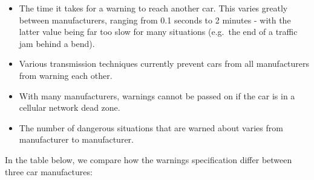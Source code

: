 \documentclass[
]{book}
\providecommand{\tightlist}{%
  \setlength{\itemsep}{0pt}\setlength{\parskip}{0pt}}
\begin{document}
\begin{itemize}
\tightlist
\item
  The time it takes for a warning to reach another car. This varies greatly between manufacturers, ranging from 0.1 seconds to 2 minutes - with the latter value being far too slow for many situations (e.g.~the end of a traffic jam behind a bend).
\item
  Various transmission techniques currently prevent cars from all manufacturers from warning each other.
\item
  With many manufacturers, warnings cannot be passed on if the car is in a cellular network dead zone.
\item
  The number of dangerous situations that are warned about varies from manufacturer to manufacturer.
\end{itemize}

In the table below, we compare how the warnings specification differ between three car manufactures:
\end{document}
